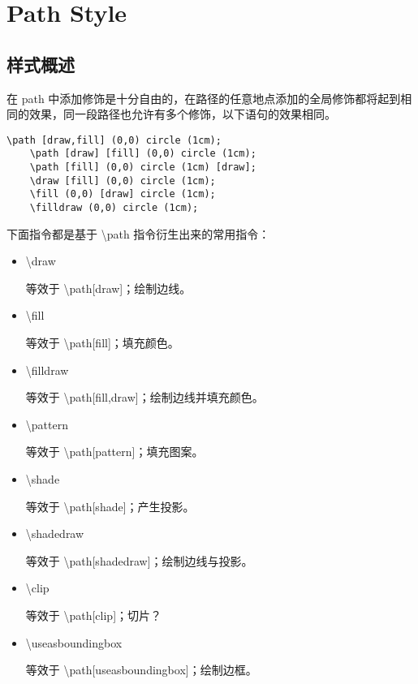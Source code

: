 \section{Path Style}

\subsection{样式概述}

在 path 中添加修饰是十分自由的，在路径的任意地点添加的全局修饰都将起到相同的效果，同一段路径也允许有多个修饰，以下语句的效果相同。

\begin{lstlisting}[style = latex-side]
    \path [draw,fill] (0,0) circle (1cm);
    \path [draw] [fill] (0,0) circle (1cm);
    \path [fill] (0,0) circle (1cm) [draw];
    \draw [fill] (0,0) circle (1cm);
    \fill (0,0) [draw] circle (1cm);
    \filldraw (0,0) circle (1cm);
\end{lstlisting}

下面指令都是基于 \textbackslash path 指令衍生出来的常用指令：
\begin{itemize}
    \item \textbackslash draw  
    
    等效于 \textbackslash path[draw]；绘制边线。
    \item \textbackslash fill 
    
    等效于 \textbackslash path[fill]；填充颜色。
    \item \textbackslash filldraw
    
    等效于 \textbackslash path[fill,draw]；绘制边线并填充颜色。
    \item \textbackslash pattern  
    
    等效于 \textbackslash path[pattern]；填充图案。
    \item \textbackslash shade  
    
    等效于 \textbackslash path[shade]；产生投影。
    \item \textbackslash shadedraw  
    
    等效于 \textbackslash path[shadedraw]；绘制边线与投影。
    \item \textbackslash clip  
    
    等效于 \textbackslash path[clip]；切片？
    \item \textbackslash useasboundingbox  
    
    等效于 \textbackslash path[useasboundingbox]；绘制边框。
\end{itemize}


